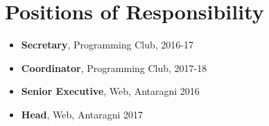 \section*{\sc Positions of Responsibility}
\vspace{-2mm}
\hrulefill
\vspace{.2cm}

\begin{itemize}
\item \textbf{Secretary}, Programming Club, 2016-17
\item \textbf{Coordinator}, Programming Club, 2017-18
\item \textbf{Senior Executive}, Web, Antaragni 2016
\item \textbf{Head}, Web, Antaragni 2017
\end{itemize}
